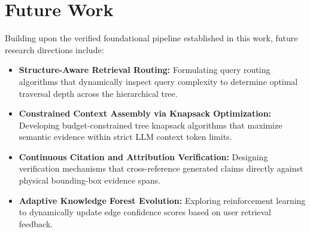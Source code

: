 \documentclass[12pt,a4paper]{report}
\begin{document}
\section{Future Work}
Building upon the verified foundational pipeline established in this work, future research directions include:
\begin{itemize}
    \item \textbf{Structure-Aware Retrieval Routing:} Formulating query routing algorithms that dynamically inspect query complexity to determine optimal traversal depth across the hierarchical tree.
    \item \textbf{Constrained Context Assembly via Knapsack Optimization:} Developing budget-constrained tree knapsack algorithms that maximize semantic evidence within strict LLM context token limits.
    \item \textbf{Continuous Citation and Attribution Verification:} Designing verification mechanisms that cross-reference generated claims directly against physical bounding-box evidence spans.
    \item \textbf{Adaptive Knowledge Forest Evolution:} Exploring reinforcement learning to dynamically update edge confidence scores based on user retrieval feedback.
\end{itemize}

\clearpage
{}
\end{document}
